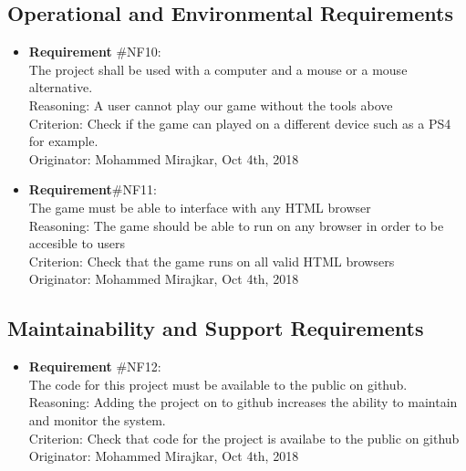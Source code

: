 \documentclass[12pt, titlepage]{article}
\renewcommand{\bf}{\textbf}
\begin{document}
\subsection{Operational and Environmental Requirements}
\begin{itemize}
	\item  {\color {blue}\bf{ Requirement}} \#NF{\color {blue}10:}\\
	      The project shall be used with a computer and a mouse or a mouse alternative.\\
	      Reasoning: A user cannot play our game without the tools above\\
	      Criterion:  Check if the game can played on a different device such as a PS4 for example.\\
	      Originator: Mohammed Mirajkar, Oct 4th, 2018

	\item  {\color {blue}\bf{ Requirement}}\#NF{\color{blue}11:}\\
	      The game must be able to interface with any HTML browser\\
	      Reasoning: The game should be able to run on any browser in order to be accesible to users\\
	      Criterion:  Check that the game runs on all valid HTML browsers\\
	      Originator: Mohammed Mirajkar, Oct 4th, 2018
\end{itemize}

\subsection{Maintainability and Support Requirements}
\begin{itemize}
	\item  {\color {blue}\bf{ Requirement}} {\color {blue} \#NF{\color {blue}12:}}\\
	      The code for this project must be available to the public on github.\\
	      Reasoning: Adding the project on  to github increases the ability to maintain and monitor the system.\\
	      Criterion: Check that code for the project is availabe to the public on github\\
	      Originator: Mohammed Mirajkar, Oct 4th, 2018

\end{itemize}
\end{document}
